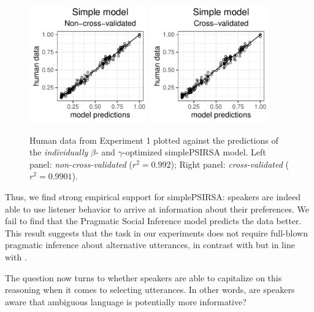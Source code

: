 \documentclass[10pt,a4paper]{article}
\begin{document}
\begin{figure}[ht]
	\centering
	\includegraphics[width=2in]{images/m5.pdf}
	\includegraphics[width=2in]{images/m8.pdf}
	\caption{Human data from Experiment 1 plotted against the predictions of the \emph{individually} $\beta$- and $\gamma$-optimized simplePSIRSA model. Left panel: \emph{non-cross-validated} ($r^{2}=0.992$); Right panel: \emph{cross-validated} ($r^{2}=0.9901$).}\label{cross-validation}
\end{figure}


Thus, we find strong empirical support for simplePSIRSA: speakers are indeed able to use listener behavior to arrive at information about their preferences. We fail to find that the Pragmatic Social Inference model predicts the data better. This result suggests that the task in our experiments does not require full-blown pragmatic inference about alternative utterances, in contrast with  but in line with . 

The question now turns to whether speakers are able to capitalize on this reasoning when it comes to selecting utterances. In other words, are speakers aware that ambiguous language is potentially more informative?
\end{document}

